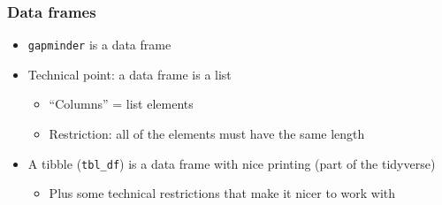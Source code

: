 \documentclass[
]{article}
\newenvironment{Shaded}{\begin{snugshade}}{\end{snugshade}}
\newcommand{\DecValTok}[1]{\textcolor[rgb]{0.00,0.00,0.81}{#1}}
\newcommand{\KeywordTok}[1]{\textcolor[rgb]{0.13,0.29,0.53}{\textbf{#1}}}
\newcommand{\NormalTok}[1]{#1}
\newcommand{\OperatorTok}[1]{\textcolor[rgb]{0.81,0.36,0.00}{\textbf{#1}}}
\newcommand{\StringTok}[1]{\textcolor[rgb]{0.31,0.60,0.02}{#1}}
\providecommand{\tightlist}{%
  \setlength{\itemsep}{0pt}\setlength{\parskip}{0pt}}
\begin{document}
\begin{Shaded}
\end{Shaded}

\hypertarget{data-frames}{%
\subsubsection{Data frames}\label{data-frames}}

\begin{itemize}
\tightlist
\item
  \texttt{gapminder} is a data frame
\item
  Technical point: a data frame is a list

  \begin{itemize}
  \tightlist
  \item
    ``Columns'' = list elements
  \item
    Restriction: all of the elements must have the same length
  \end{itemize}
\item
  A tibble (\texttt{tbl\_df}) is a data frame with nice printing (part of the tidyverse)

  \begin{itemize}
  \tightlist
  \item
    Plus some technical restrictions that make it nicer to work with
  \end{itemize}
\end{itemize}
\end{document}
